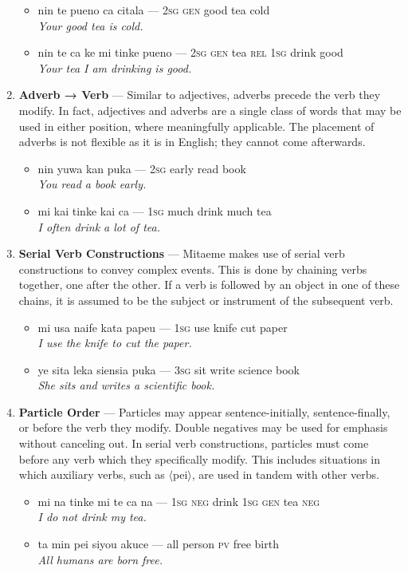 \documentclass[a4paper, titlepage]{article}
\begin{document}
\begin{enumerate}
	\begin{itemize}
		\item nin te pueno ca citala — \textsc{2sg} \textsc{gen} good tea cold\\\textit{Your good tea is cold.}
		\item nin te ca ke mi tinke pueno — \textsc{2sg gen} tea \textsc{rel 1sg} drink good\\\textit{Your tea I am drinking is good.}
	\end{itemize}
	\item \textbf{Adverb → Verb} — Similar to adjectives, adverbs precede the verb they modify. In fact, adjectives and adverbs are a single class of words that may be used in either position, where meaningfully applicable. The placement of adverbs is not flexible as it is in English; they cannot come afterwards.
	\begin{itemize}
		\item nin yuwa kan puka — \textsc{2sg} early read book\\\textit{You read a book early.}
		\item mi kai tinke kai ca — \textsc{1sg} much drink much tea\\\textit{I often drink a lot of tea.}
	\end{itemize}
	\item \textbf{Serial Verb Constructions} — Mitaeme makes use of serial verb constructions to convey complex events. This is done by chaining verbs together, one after the other. If a verb is followed by an object in one of these chains, it is assumed to be the subject or instrument of the subsequent verb.
	\begin{itemize}
		\item mi usa naife kata papeu — \textsc{1sg} use knife cut paper\\\textit{I use the knife to cut the paper.}
		\item ye sita leka siensia puka — \textsc{3sg} sit write science book\\\textit{She sits and writes a scientific book.}
	\end{itemize}
	\item \textbf{Particle Order} — Particles may appear sentence-initially, sentence-finally, or before the verb they modify. Double negatives may be used for emphasis without canceling out. In serial verb constructions, particles must come before any verb which they specifically modify. This includes situations in which auxiliary verbs, such as $\langle$pei$\rangle$, are used in tandem with other verbs.
	\begin{itemize}
		\item mi na tinke mi te ca na — \textsc{1sg} \textsc{neg} drink \textsc{1sg} \textsc{gen} tea \textsc{neg}\\\textit{I do not drink my tea.}
		\item ta min pei siyou akuce — all person \textsc{pv} free birth\\\textit{All humans are born free.}
	\end{itemize}
\end{enumerate}
\end{document}
